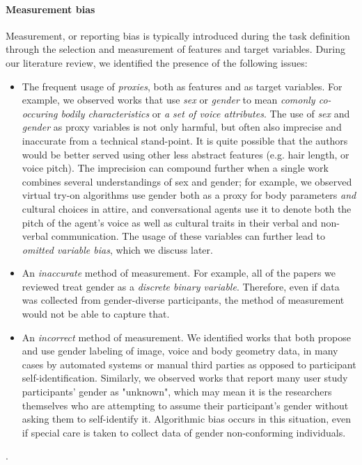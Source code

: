 \documentclass[nonacm,sigconf,review,balance=false]{acmart}
\begin{document}
\paragraph*{Measurement bias} Measurement, or reporting bias is typically introduced during the task definition through the selection and measurement of features and target variables. During our literature review, we identified the presence of the following issues:
\begin{itemize}
    \item The frequent usage of \emph{proxies}, both as features and as target variables. For example, we observed works that use \emph{sex} or \emph{gender} to mean \emph{comonly co-occuring bodily characteristics} or \emph{a set of voice attributes}.
    The use of \emph{sex} and \emph{gender} as proxy variables is not only harmful, but often also imprecise and inaccurate from a technical stand-point. It is quite possible that the authors would be better served using other less abstract features (e.g. hair length, or voice pitch). The imprecision can compound further when a single work combines several understandings of sex and gender; for example, we observed virtual try-on algorithms use gender both as a proxy for body parameters \emph{and} cultural choices in attire, and conversational agents use it to denote both the pitch of the agent's voice as well as cultural traits in their verbal and non-verbal communication. The usage of these variables can further lead to \emph{omitted variable bias}, which we discuss later.
    \item An \emph{inaccurate} method of measurement. For example, all of the papers we reviewed treat gender as a \emph{discrete binary variable}. Therefore, even if data was collected from gender-diverse participants, the method of measurement would not be able to capture that.
    \item An \emph{incorrect} method of measurement. We identified works that both propose and use gender labeling of image, voice and body geometry data, in many cases by automated systems or manual third parties as opposed to participant self-identification. Similarly, we observed works that report many user study participants' gender as "unknown", which may mean it is the researchers themselves who are attempting to assume their participant's gender without asking them to self-identify it. Algorithmic bias occurs in this situation, even if special care is taken to collect data of gender non-conforming individuals.
\end{itemize}.
\end{document}
